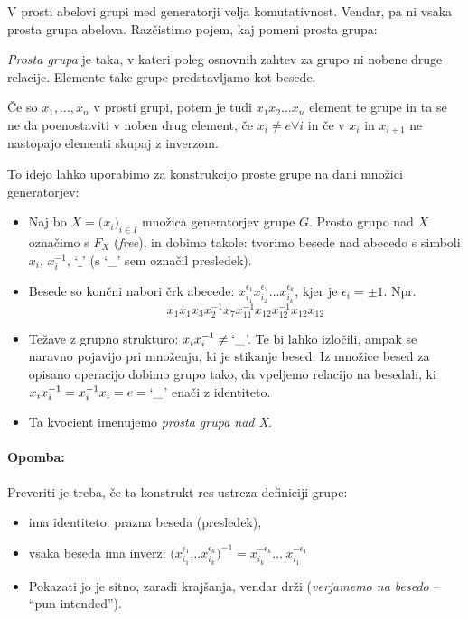 V prosti abelovi grupi med generatorji velja komutativnost. Vendar, pa ni vsaka prosta grupa abelova. Raz\v cistimo pojem, kaj
pomeni prosta grupa:
\begin{defin}
	{\em Prosta grupa} je taka, v kateri poleg osnovnih zahtev za grupo ni nobene druge relacije. Elemente take grupe
	predstavljamo kot besede.\vspace{6pt} 

	\ni \v Ce so $x_1, \ldots, x_n$ v prosti grupi, potem je tudi $x_1 x_2 \ldots x_n$ element te grupe in ta se ne da
	poenostaviti v noben drug element, \v ce $x_i \neq e \forall i$ in \v ce v $x_i$ in $x_{i+1}$ ne nastopajo elementi skupaj z
	inverzom.\vspace{6pt}

	\ni To idejo lahko uporabimo za konstrukcijo proste grupe na dani mno\v zici generatorjev:
	\begin{itemize}
		\item{Naj bo $X = \big(x_i\big)_{i\in I}$ mno\v zica generatorjev grupe $G$. Prosto grupo nad $X$ ozna\v cimo s $F_X$
			({\em free}), in dobimo takole: tvorimo besede nad abecedo s simboli $x_i$, $x_i^{-1}$, `$\_$' (s `\_' sem
			ozna\v cil presledek).} 
		\item{Besede so kon\v cni nabori \v crk abecede:
			$x_{i_1}^{\epsilon_1}x_{i_2}^{\epsilon_2}\ldots x_{i_k}^{\epsilon_k}$,
			kjer je $\epsilon_i = \pm 1$. Npr.
			\[
				x_1x_1x_3x_2^{-1}x_7x_{11}^{-1}x_{12}x_{12}^{-1}x_{12}x_{12}
			\]
		}
		\item{Te\v zave z grupno strukturo: $x_i x_i^{-1} \neq `\_$'. Te bi lahko izlo\v cili, ampak se naravno pojavijo pri
			mno\v zenju, ki je stikanje besed. Iz mno\v zice besed za opisano operacijo dobimo grupo tako, da vpeljemo
			relacijo na besedah, ki $x_i x_i^{-1} = x_i^{-1} x_i = e = `\_$' ena\v ci z identiteto.
		}
		\item{Ta kvocient imenujemo {\em prosta grupa nad X}.}
	\end{itemize}
\end{defin}

\paragraph{Opomba:} Preveriti je treba, \v ce ta konstrukt res ustreza definiciji grupe:
\begin{itemize}
	\item{ima identiteto: prazna beseda (presledek),}
	\item{vsaka beseda ima inverz: $\big(x_{i_1}^{\epsilon_1}\ldots x_{i_k}^{\epsilon_k}\big)^{-1} = x_{i_k}^{-\epsilon_k} 
		\ldots\ x_{i_1}^{-\epsilon_1}$}
	\item{Pokazati jo je sitno, zaradi kraj\v sanja, vendar dr\v zi ({\em verjamemo na besedo} -- "`pun intended"').}
\end{itemize}

